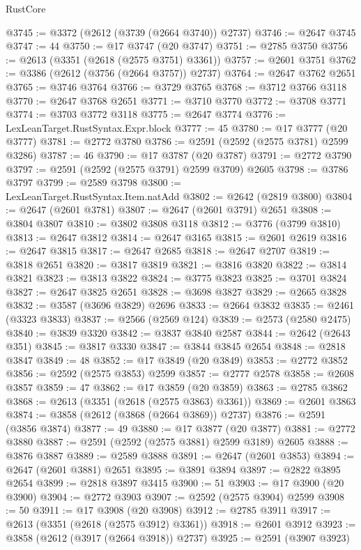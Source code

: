 \begin{lexlean}{RustCore}
\begin{coremodule}
@3745 := @3372 (@2612 (@3739 (@2664 @3740)) @2737)
@3746 := @2647 @3745
@3747 := 44
@3750 := @17 @3747 (@20 @3747)
@3751 := @2785 @3750
@3756 := @2613 (@3351 (@2618 (@2575 @3751) @3361))
@3757 := @2601 @3751
@3762 := @3386 (@2612 (@3756 (@2664 @3757)) @2737)
@3764 := @2647 @3762 @2651
@3765 := @3746 @3764
@3766 := @3729 @3765
@3768 := @3712 @3766 @3118
@3770 := @2647 @3768 @2651
@3771 := @3710 @3770
@3772 := @3708 @3771
@3774 := @3703 @3772 @3118
@3775 := @2647 @3774
@3776 := LexLeanTarget.RustSyntax.Expr.block
@3777 := 45
@3780 := @17 @3777 (@20 @3777)
@3781 := @2772 @3780
@3786 := @2591 (@2592 (@2575 @3781) @2599 @3286)
@3787 := 46
@3790 := @17 @3787 (@20 @3787)
@3791 := @2772 @3790
@3797 := @2591 (@2592 (@2575 @3791) @2599 @3709) @2605
@3798 := @3786 @3797
@3799 := @2589 @3798
@3800 := LexLeanTarget.RustSyntax.Item.natAdd
@3802 := @2642 (@2819 @3800)
@3804 := @2647 (@2601 @3781)
@3807 := @2647 (@2601 @3791) @2651
@3808 := @3804 @3807
@3810 := @3802 @3808 @3118
@3812 := @3776 (@3799 @3810)
@3813 := @2647 @3812
@3814 := @2647 @3165
@3815 := @2601 @2619
@3816 := @2647 @3815
@3817 := @2647 @2685
@3818 := @2647 @2707
@3819 := @3818 @2651
@3820 := @3817 @3819
@3821 := @3816 @3820
@3822 := @3814 @3821
@3823 := @3813 @3822
@3824 := @3775 @3823
@3825 := @3701 @3824
@3827 := @2647 @3825 @2651
@3828 := @3698 @3827
@3829 := @2665 @3828
@3832 := @3587 (@3696 @3829) @2696
@3833 := @2664 @3832
@3835 := @2461 (@3323 @3833)
@3837 := @2566 (@2569 @124)
@3839 := @2573 (@2580 @2475)
@3840 := @3839 @3320
@3842 := @3837 @3840 @2587
@3844 := @2642 (@2643 @351)
@3845 := @3817 @3330
@3847 := @3844 @3845 @2654
@3848 := @2818 @3847
@3849 := 48
@3852 := @17 @3849 (@20 @3849)
@3853 := @2772 @3852
@3856 := @2592 (@2575 @3853) @2599
@3857 := @2777 @2578
@3858 := @2608 @3857
@3859 := 47
@3862 := @17 @3859 (@20 @3859)
@3863 := @2785 @3862
@3868 := @2613 (@3351 (@2618 (@2575 @3863) @3361))
@3869 := @2601 @3863
@3874 := @3858 (@2612 (@3868 (@2664 @3869)) @2737)
@3876 := @2591 (@3856 @3874)
@3877 := 49
@3880 := @17 @3877 (@20 @3877)
@3881 := @2772 @3880
@3887 := @2591 (@2592 (@2575 @3881) @2599 @3189) @2605
@3888 := @3876 @3887
@3889 := @2589 @3888
@3891 := @2647 (@2601 @3853)
@3894 := @2647 (@2601 @3881) @2651
@3895 := @3891 @3894
@3897 := @2822 @3895 @2654
@3899 := @2818 @3897 @3415
@3900 := 51
@3903 := @17 @3900 (@20 @3900)
@3904 := @2772 @3903
@3907 := @2592 (@2575 @3904) @2599
@3908 := 50
@3911 := @17 @3908 (@20 @3908)
@3912 := @2785 @3911
@3917 := @2613 (@3351 (@2618 (@2575 @3912) @3361))
@3918 := @2601 @3912
@3923 := @3858 (@2612 (@3917 (@2664 @3918)) @2737)
@3925 := @2591 (@3907 @3923)

\end{coremodule}
\end{lexlean}
